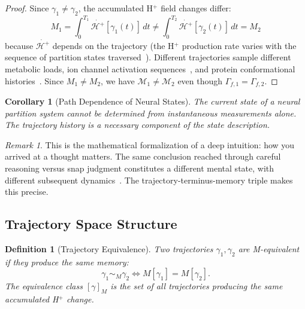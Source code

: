 \documentclass[10pt,twocolumn]{article}
\newtheorem{corollary}[theorem]{Corollary}
\newtheorem{definition}[theorem]{Definition}
\theoremstyle{remark}
\newtheorem{remark}[theorem]{Remark}
\newcommand{\Gstate}{\Gamma}
\newcommand{\Hfield}{\mathcal{H}^+}
\newcommand{\Mstate}{\mathcal{M}}
\begin{document}
\begin{proof}
Since $\gamma_1 \neq \gamma_2$, the accumulated H$^+$ field changes differ:
\begin{equation}
M_1 = \int_0^{T_1} \dot{\Hfield}[\gamma_1(t)]\,dt \neq \int_0^{T_2} \dot{\Hfield}[\gamma_2(t)]\,dt = M_2
\end{equation}
because $\dot{\Hfield}$ depends on the trajectory (the H$^+$ production rate varies with the sequence of partition states traversed~\cite{wikstrom2015proton,nicholls2013bioenergetics}). Different trajectories sample different metabolic loads, ion channel activation sequences~\cite{hille2001ion}, and protein conformational histories~\cite{hartl2011molecular}. Since $M_1 \neq M_2$, we have $\Mstate_1 \neq \Mstate_2$ even though $\Gstate_{f,1} = \Gstate_{f,2}$.
\end{proof}

\begin{corollary}[Path Dependence of Neural States]
\label{cor:pathdep}
The current state of a neural partition system cannot be determined from instantaneous measurements alone. The trajectory history is a necessary component of the state description.
\end{corollary}

\begin{remark}
This is the mathematical formalization of a deep intuition: how you arrived at a thought matters. The same conclusion reached through careful reasoning versus snap judgment constitutes a different mental state, with different subsequent dynamics~\cite{tulving1972episodic,eichenbaum2000hippocampus}. The trajectory-terminus-memory triple makes this precise.
\end{remark}

\subsection{Trajectory Space Structure}

\begin{definition}[Trajectory Equivalence]
\label{def:traj_equiv}
Two trajectories $\gamma_1, \gamma_2$ are \emph{M-equivalent} if they produce the same memory:
\begin{equation}
\gamma_1 \sim_M \gamma_2 \iff M[\gamma_1] = M[\gamma_2].
\end{equation}
The equivalence class $[\gamma]_M$ is the set of all trajectories producing the same accumulated H$^+$ change.
\end{definition}
\end{document}
